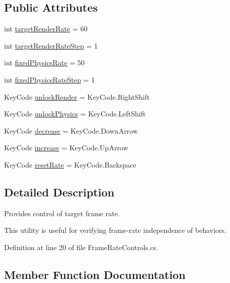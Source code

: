 \subsection*{Public Attributes}
\begin{DoxyCompactItemize}
\item 
int \mbox{\hyperlink{class_leap_1_1_unity_1_1_frame_rate_controls_a1a6ec6e7fcf26a83d24d57c4596f5e9d}{target\+Render\+Rate}} = 60
\item 
int \mbox{\hyperlink{class_leap_1_1_unity_1_1_frame_rate_controls_a7cf289769d60fe1077b5ba8f24b7ad3f}{target\+Render\+Rate\+Step}} = 1
\item 
int \mbox{\hyperlink{class_leap_1_1_unity_1_1_frame_rate_controls_a5d4115c3b400aeba1a161f1c139d77f9}{fixed\+Physics\+Rate}} = 50
\item 
int \mbox{\hyperlink{class_leap_1_1_unity_1_1_frame_rate_controls_a0324db0c9ad9d72f80338ed2dc32a813}{fixed\+Physics\+Rate\+Step}} = 1
\item 
Key\+Code \mbox{\hyperlink{class_leap_1_1_unity_1_1_frame_rate_controls_a694da099202f1f4a86c3358e26208305}{unlock\+Render}} = Key\+Code.\+Right\+Shift
\item 
Key\+Code \mbox{\hyperlink{class_leap_1_1_unity_1_1_frame_rate_controls_a0d1ab1f9d0a8b8735e13117e66ab0f1d}{unlock\+Physics}} = Key\+Code.\+Left\+Shift
\item 
Key\+Code \mbox{\hyperlink{class_leap_1_1_unity_1_1_frame_rate_controls_a9bbe07ab41d1b06fe8597595e322b666}{decrease}} = Key\+Code.\+Down\+Arrow
\item 
Key\+Code \mbox{\hyperlink{class_leap_1_1_unity_1_1_frame_rate_controls_a901d4ad3ab628ada1a1621aa7cc89b36}{increase}} = Key\+Code.\+Up\+Arrow
\item 
Key\+Code \mbox{\hyperlink{class_leap_1_1_unity_1_1_frame_rate_controls_a904a1a7f604d668a4c26d6a3175481c4}{reset\+Rate}} = Key\+Code.\+Backspace
\end{DoxyCompactItemize}


\subsection{Detailed Description}
Provides control of target frame rate. 

This utility is useful for verifying frame-\/rate independence of behaviors. 

Definition at line 20 of file Frame\+Rate\+Controls.\+cs.



\subsection{Member Function Documentation}
\mbox{\label{class_leap_1_1_unity_1_1_frame_rate_controls_a3470f5917df3d9d796c5dbdc3e2e345c}} 
